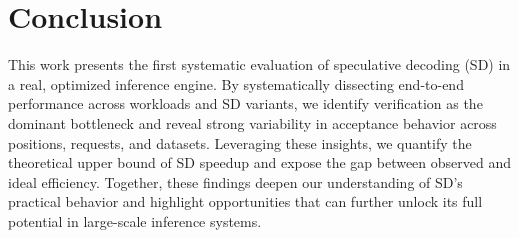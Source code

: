 \documentclass{article}
\begin{document}




\section{Conclusion}
This work presents the first systematic evaluation of speculative decoding (SD) in a real, optimized inference engine. By systematically dissecting end-to-end performance across workloads and SD variants, we identify verification as the dominant bottleneck and reveal strong variability in acceptance behavior across positions, requests, and datasets. Leveraging these insights, we quantify the theoretical upper bound of SD speedup and expose the gap between observed and ideal efficiency. Together, these findings deepen our understanding of SD’s practical behavior and highlight opportunities that can further unlock its full potential in large-scale inference systems.
\end{document}

